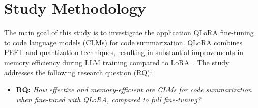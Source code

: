 \section{Study Methodology} 
\label{sec:design}



The main goal of this study is to investigate the application QLoRA fine-tuning to code language models (CLMs) for code summarization. QLoRA combines PEFT and quantization techniques, resulting in substantial improvements in memory efficiency during LLM training compared to LoRA~\cite{dettmers2024qlora}. The study addresses the following research question (RQ): 

\begin{itemize}[label=,leftmargin=0.2cm]
	\item \textbf{RQ:} \emph{How effective and memory-efficient are CLMs for code summarization when fine-tuned with QLoRA, compared to full fine-tuning?}





		
	
	
	
	

\end{itemize}
